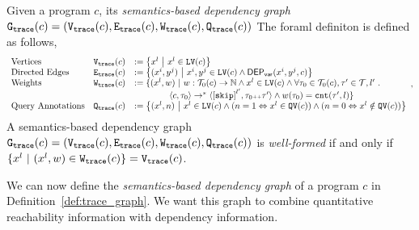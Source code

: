 \begin{defn}
  \label{def:trace_graph}
  Given a program ${c}$,
  its \emph{semantics-based dependency graph} 
  $\mathtt{{G_{trace}}}({c}) = (\mathtt{{V_{trace}}}({c}), \mathtt{{E_{trace}}}({c}), \mathtt{{W_{trace}}}({c}), \mathtt{{Q_{trace}}}({c}))$ 
  The foraml definiton is defined as follows,
  {\small
  \[
  \begin{array}{lll}
    \text{Vertices} &
    \traceV({c}) & := \left\{ 
    x^l
    ~ \middle\vert ~ x^l \in \lvar(c)
    \right\}
    \\
    \text{Directed Edges} &
    \traceE({c}) & := 
    \left\{ 
    (x^i, y^j) 
    ~ \middle\vert ~
    x^i, y^j \in \lvar(c) \land \vardep(x^i, y^j, c) 
    \right\}
    \\
    \text{Weights} &
    \traceW({c}) & := 
    \{ 
    (x^l, w) 
    ~ \vert ~ 
    w : \tdom_0(c) \to \mathbb{N}
    \land
    x^l \in \lvar(c) \land
    \forall \trace_0 \in \tdom_0(c), \trace' \in \tdom, l' \st
    \\ & & \qquad \qquad
    \config{{c}, \trace_0} \to^{*} 
    \config{\clabel{\eskip}^{l'}, \trace_0 \tracecat \trace'} 
    \land w(\trace_0) = \vcounter(\trace', l) \} 
     \\
    \text{Query Annotations} &
    \traceF({c}) & := 
  \left\{(x^l, n)  
  ~ \middle\vert ~
   x^l \in \lvar(c) \land
  (n = 1 \Leftrightarrow x^l \in \qvar(c))\land ( n = 0 \Leftrightarrow  x^l \notin \qvar(c))
  \right\}
  \end{array},
  \]
  A semantics-based dependency graph $\mathtt{{G_{trace}}}({c})= (\mathtt{{V_{trace}}}({c}), \mathtt{{E_{trace}}}({c}), \mathtt{{W_{trace}}}({c}), \mathtt{{Q_{trace}}}({c}))$ is \emph{well-formed} if and only if $ \{x^l \ |\ (x^l,w)\in \mathtt{{W_{trace}}}({c})\} = \mathtt{{V_{trace}}}({c}) $.
  }
  \end{defn}
We can now define the \emph{semantics-based dependency graph} of a program $c$ in Definition~\ref{def:trace_graph}. We want this graph to combine quantitative reachability information with dependency information. 

